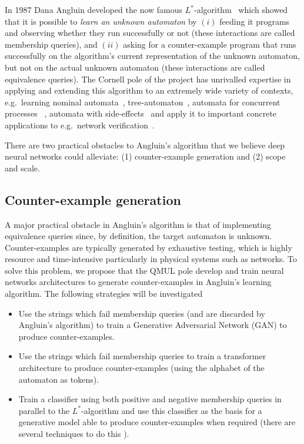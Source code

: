 \documentclass[11pt,a4paper]{article}
\begin{document}
	In 1987 Dana Angluin developed the now famous $L^\ast$-algorithm~\cite{angluin1987learning} which showed that it is possible to \emph{learn an unknown automaton} by $(i)$ feeding it programs and observing whether they run successfully or not (these interactions are called membership queries), and $(ii)$ asking for a counter-example program that runs successfully on the algorithm's current representation of the unknown automaton, but not on the actual unknown automaton (these interactions are called equivalence queries).  The Cornell pole of the project has unrivalled expertise in applying and extending this algorithm to an extremely wide variety of contexts, e.g.\ learning nominal automata~\cite{moerman2017learning}, tree-automaton~\cite{heerdt2022categorical}, automata for concurrent processes ~\cite{van2021learning}, automata with side-effects~\cite{van2020learning} and apply it to important concrete applications to e.g.\ network verification~\cite{ferreira2021prognosis}.
	  
	There are two practical obstacles to Angluin's algorithm that we believe deep neural networks could alleviate: (1) counter-example generation and (2) scope and scale.
	\setcounter{section}{1}
	\setcounter{subsection}{0}
		\subsection{Counter-example generation}
		A major practical obstacle in Angluin's algorithm is that of implementing equivalence queries since, by definition, the target automaton is unknown. Counter-examples are typically generated by exhaustive testing, which is highly resource and time-intensive particularly in physical systems such as networks. To solve this problem, we propose that the  QMUL pole develop and train neural networks architectures to generate counter-examples in Angluin's learning algorithm. The following strategies will be investigated
		\begin{itemize}
			\item Use the strings which fail membership queries (and are discarded by Angluin's algorithm) to train a Generative Adversarial Network (GAN) to produce counter-examples.
			\item Use the strings which fail membership queries to train a transformer architecture to produce counter-examples (using the alphabet of the automaton as tokens).
			\item Train a classifier using both positive and negative membership queries in parallel to the $L^\ast$-algorithm and use this classifier as the basis for a generative model able to produce counter-examples when required (there are several techniques to do this \cite{?}).
		\end{itemize}
		
\end{document}
